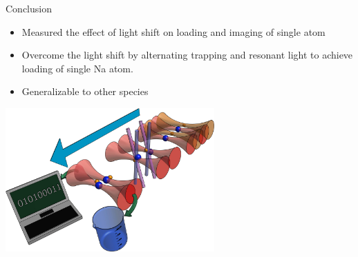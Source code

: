 \documentclass{beamer}
\begin{document}
\begin{frame}[t]{Conclusion}
  \begin{itemize}
  \item Measured the effect of light shift on loading and imaging of single atom
  \item Overcome the light shift by alternating trapping and resonant light to achieve loading of single Na atom.
  \item Generalizable to other species
  \end{itemize}
  \begin{center}
    \includegraphics[width=8cm]{overall_full_min.png}
  \end{center}
\end{frame}

\begin{frame}
\end{frame}
\end{document}
